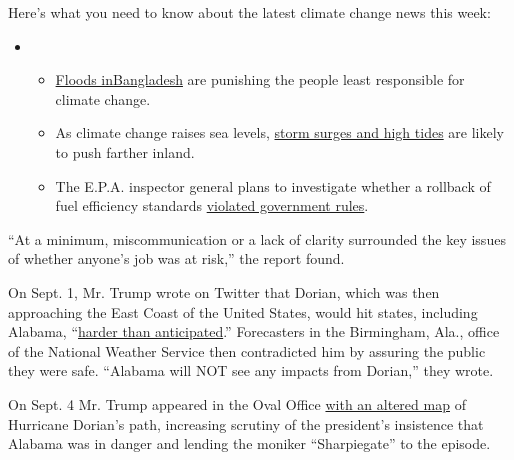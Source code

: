 Here's what you need to know about the latest climate change news this
week:

\begin{itemize}
\item
  \begin{itemize}
  \tightlist
  \item
    \href{https://www.nytimes.com/2020/07/30/climate/bangladesh-floods.html?action=click\&pgtype=Article\&state=default\&region=MAIN_CONTENT_1\&context=storylines_keepup}{Floods
    in}\href{https://www.nytimes.com/2020/07/30/climate/bangladesh-floods.html?action=click\&pgtype=Article\&state=default\&region=MAIN_CONTENT_1\&context=storylines_keepup}{Bangladesh}
    are punishing the people least responsible for climate change.
  \item
    As climate change raises sea levels,
    \href{https://www.nytimes.com/2020/07/30/climate/sea-level-inland-floods.html?action=click\&pgtype=Article\&state=default\&region=MAIN_CONTENT_1\&context=storylines_keepup}{storm
    surges and high tides} are likely to push farther inland.
  \item
    The E.P.A. inspector general plans to investigate whether a rollback
    of fuel efficiency standards
    \href{https://www.nytimes.com/2020/07/27/climate/trump-fuel-efficiency-rule.html?action=click\&pgtype=Article\&state=default\&region=MAIN_CONTENT_1\&context=storylines_keepup}{violated
    government rules}.
  \end{itemize}
\end{itemize}

``At a minimum, miscommunication or a lack of clarity surrounded the key
issues of whether anyone's job was at risk,'' the report found.

On Sept. 1, Mr. Trump wrote on Twitter that Dorian, which was then
approaching the East Coast of the United States, would hit states,
including Alabama,
``\href{https://twitter.com/realDonaldTrump/status/1168174613827899393}{harder
than anticipated}.'' Forecasters in the Birmingham, Ala., office of the
National Weather Service then contradicted him by assuring the public
they were safe. ``Alabama will NOT see any impacts from Dorian,'' they
wrote.

On Sept. 4 Mr. Trump appeared in the Oval Office
\href{https://www.nytimes.com/2019/09/04/us/politics/trump-hurricane-alabama-sharpie.html}{with
an altered map} of Hurricane Dorian's path, increasing scrutiny of the
president's insistence that Alabama was in danger and lending the
moniker ``Sharpiegate'' to the episode.

